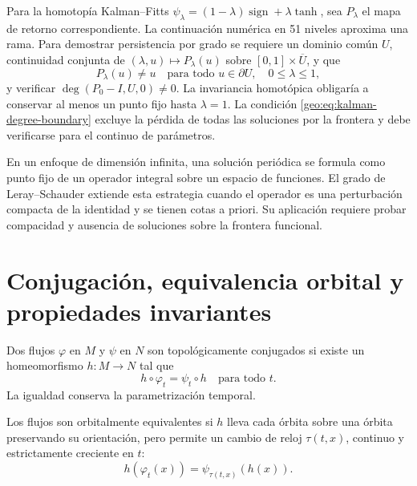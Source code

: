 Para la homotopía Kalman--Fitts
\(\psi_\lambda=(1-\lambda)\operatorname{sign}+\lambda\tanh\), sea
\(P_\lambda\) el mapa de retorno correspondiente. La continuación numérica en
51 niveles aproxima una rama. Para demostrar persistencia por grado se
requiere un dominio común \(U\), continuidad conjunta de
\((\lambda,u)\mapsto P_\lambda(u)\) sobre
\([0,1]\times\overline U\), y que
\begin{equation}
 P_\lambda(u)\ne u
 \quad\text{para todo }u\in\partial U,
 \quad 0\le\lambda\le1,
 \label{geo:eq:kalman-degree-boundary}
\end{equation}
y verificar
\(\deg(P_0-I,U,0)\ne0\). La invariancia homotópica obligaría a conservar al
menos un punto fijo hasta \(\lambda=1\). La condición
\eqref{geo:eq:kalman-degree-boundary} excluye la pérdida de todas las
soluciones por la frontera y debe verificarse para el continuo de parámetros.

En un enfoque de dimensión infinita, una solución periódica se formula como
punto fijo de un operador integral sobre un espacio de funciones. El grado de
Leray--Schauder extiende esta estrategia cuando el operador es una
perturbación compacta de la identidad y se tienen cotas a priori. Su aplicación
requiere probar compacidad y ausencia de soluciones sobre la frontera
funcional.

\section{Conjugación, equivalencia orbital y propiedades invariantes}
\label{sec:geo-equivalence}

\begin{definition}
Dos flujos \(\varphi\) en \(M\) y \(\psi\) en \(N\) son topológicamente
conjugados si existe un homeomorfismo \(h:M\to N\) tal que
\begin{equation}
 h\circ\varphi_t=\psi_t\circ h
 \quad\text{para todo }t.
 \label{geo:eq:topological-conjugacy}
\end{equation}
La igualdad conserva la parametrización temporal.
\end{definition}

\begin{definition}
Los flujos son orbitalmente equivalentes si \(h\) lleva cada órbita sobre una
órbita preservando su orientación, pero permite un cambio de reloj
\(\tau(t,x)\), continuo y estrictamente creciente en \(t\):
\begin{equation}
 h(\varphi_t(x))=\psi_{\tau(t,x)}(h(x)).
 \label{geo:eq:orbital-equivalence}
\end{equation}
\end{definition}

